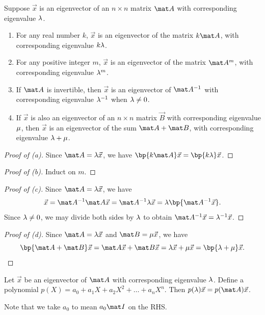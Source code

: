 \begin{proposition}
    Suppose $\vec x$ is an eigenvector of an $n \times n$ matrix $\mat A$ with corresponding eigenvalue $\lambda$.
    \begin{enumerate}
        \item For any real number $k$, $\vec x$ is an eigenvector of the matrix $k \mat A$, with corresponding eigenvalue $k \lambda$.
        \item For any positive integer $m$, $\vec x$ is an eigenvector of the matrix $\mat A^m$, with corresponding eigenvalue $\lambda^m$.
        \item If $\mat A$ is invertible, then $\vec x$ is an eigenvector of $\mat A^{-1}$ with corresponding eigenvalue $\lambda^{-1}$ when $\lambda \neq 0$.
        \item If $\vec x$ is also an eigenvector of an $n \times n$ matrix $\vec B$ with corresponding eigenvalue $\mu$, then $\vec x$ is an eigenvector of the sum $\mat A + \mat B$, with corresponding eigenvalue $\lambda + \mu$.
    \end{enumerate}
\end{proposition}
\begin{proof}[Proof of \textup{(a)}]
    Since $\mat A = \l \vec x$, we have $\bp{k \mat A} \vec x = \bp{k \l} \vec x$.
\end{proof}
\begin{proof}[Proof of \textup{(b)}]
    Induct on $m$.
\end{proof}
\begin{proof}[Proof of \textup{(c)}]
    Since $\mat A = \l \vec x$, we have \[\vec x = \mat A^{-1} \mat A \vec x = \mat A^{-1} \l \vec x = \l \bp{\mat A^{-1} \vec x}.\] Since $\lambda \neq 0$, we may divide both sides by $\lambda$ to obtain $\mat A^{-1} \vec x = \l^{-1} \vec x$.
\end{proof}
\begin{proof}[Proof of \textup{(d)}]
    Since $\mat A = \l \vec x$ and $\mat B = \m \vec x$, we have \[\bp{\mat A + \mat B} \vec x = \mat A \vec x + \mat B \vec x = \l \vec x + \m \vec x = \bp{\l + \m} \vec x.\]
\end{proof}

\begin{corollary}\label{cor:cayley-hamilton}
    Let $\vec x$ be an eigenvector of $\mat A$ with corresponding eigenvalue $\lambda$. Define a polynomial $p(X) = a_0 + a_1 X + a_2 X^2 + \dots + a_n X^n$. Then $p(\l) \vec x = p(\mat A) \vec x$.
\end{corollary}
Note that we take $a_0$ to mean $a_0 \mat I$ on the RHS.

